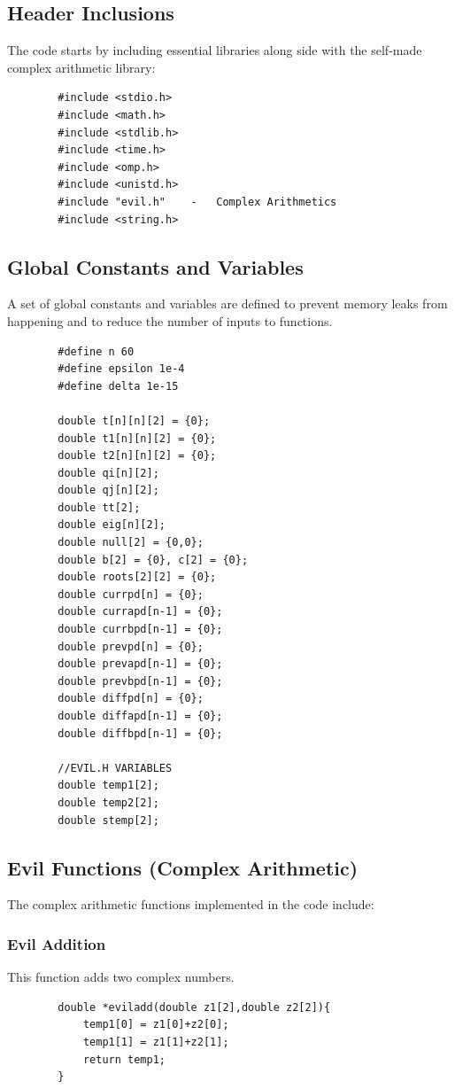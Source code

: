 \documentclass[12pt]{article}
\begin{document}
	\subsection{Header Inclusions}
	The code starts by including essential libraries along side with the self-made complex arithmetic library:
	\begin{lstlisting}
		#include <stdio.h>
		#include <math.h>
		#include <stdlib.h>
		#include <time.h>
		#include <omp.h>
		#include <unistd.h>
		#include "evil.h"    -   Complex Arithmetics
		#include <string.h>
	\end{lstlisting}
	
	\subsection{Global Constants and Variables}
	A set of global constants and variables are defined to prevent memory leaks from happening and to reduce the number of inputs to functions.
	\begin{lstlisting}
		#define n 60
		#define epsilon 1e-4
		#define delta 1e-15
		
		double t[n][n][2] = {0};
		double t1[n][n][2] = {0};
		double t2[n][n][2] = {0};
		double qi[n][2];
		double qj[n][2];
		double tt[2];
		double eig[n][2];
		double null[2] = {0,0};
		double b[2] = {0}, c[2] = {0};
		double roots[2][2] = {0};
		double currpd[n] = {0};
		double currapd[n-1] = {0};
		double currbpd[n-1] = {0};
		double prevpd[n] = {0};
		double prevapd[n-1] = {0};
		double prevbpd[n-1] = {0};
		double diffpd[n] = {0};
		double diffapd[n-1] = {0};
		double diffbpd[n-1] = {0};
		
		//EVIL.H VARIABLES
		double temp1[2];     
		double temp2[2];
		double stemp[2];
	\end{lstlisting}
	\subsection{Evil Functions (Complex Arithmetic)}
	The complex arithmetic functions implemented in the code include:
	
	\subsubsection{Evil Addition}
	This function adds two complex numbers.
	\begin{lstlisting}
		double *eviladd(double z1[2],double z2[2]){
			temp1[0] = z1[0]+z2[0];
			temp1[1] = z1[1]+z2[1];
			return temp1;
		}
	\end{lstlisting}
\end{document}
